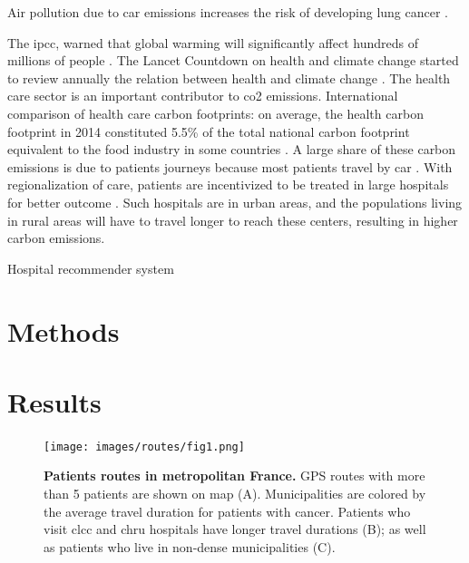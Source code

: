 Air pollution due to car emissions increases the risk of developing lung cancer \cite{raaschou-nielsen_air_2013}.

The \ac{ipcc}, warned that global warming will significantly affect hundreds of millions of people \cite{change_climate_2015}.
The Lancet Countdown on health and climate change started to review annually the relation between health and climate change \cite{watts_2020_2021}.
The health care sector is an important contributor to \ac{co2} emissions. International comparison of health care carbon footprints: on average, the health carbon footprint in 2014 constituted 5.5\% of the total national carbon footprint equivalent to the food industry in some countries \cite{pichler_international_2019}.
A large share of these carbon emissions is due to patients journeys \cite{andrews_carbon_2013,nicolet_what_2022} because most patients travel by car \cite{forner_carbon_2021}. With regionalization of care, patients are incentivized to be treated in large hospitals for better outcome \cite{eskander_health_2016}. Such hospitals are in urban areas, and the populations living in rural areas will have to travel longer to reach these centers, resulting in higher carbon emissions.

\cite{guillon_empreinte_2020}
\cite{health_care_without_harm_hcwh_global_2021}
\cite{the_shift_project_plan_2021}

Hospital recommender system
\cite{zhang_idoctor_2017}
\cite{han_hybrid_2018}
\cite{narducci_recommender_2015}
\cite{hoens_reliable_2010}
\cite{tran_recommender_2021}

\section{Methods}

\section{Results}

\begin{figure}[H]
    \texttt{[image: images/routes/fig1.png]}
    \centering
    \caption{
        \textbf{Patients routes in metropolitan France.} GPS routes with more than 5 patients are shown on map (A). Municipalities are colored by the average travel duration for patients with cancer. Patients who visit \ac{clcc} and \ac{chru} hospitals have longer travel durations (B); as well as patients who live in non-dense municipalities (C).
    }
    \label{fig:routes-duration-france}
\end{figure}

